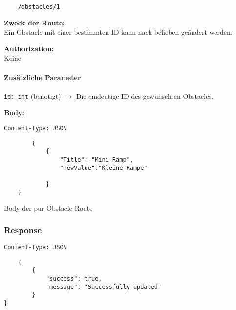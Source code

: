 \begin{lstlisting}
    /obstacles/1
\end{lstlisting}

\textbf{Zweck der Route:} \\
Ein Obstacle mit einer bestimmten ID kann nach belieben geändert werden.

\textbf{Authorization:} \\
Keine

\paragraph{Zusätzliche Parameter}
\lstinline{id: int} (benötigt)
$\rightarrow$ Die eindeutige ID des gewünschten Obstacles.

\textbf{Body:}\\
\begin{code}
    \lstinline{Content-Type: JSON}
    \begin{lstlisting}
        {
            {
                "Title": "Mini Ramp",
                "newValue":"Kleine Rampe"
    
            }
    }
    \end{lstlisting}
    \caption{Body der pur Obstacle-Route}
\end{code}

\subsubsection{Response}
\lstinline{Content-Type: JSON}
\begin{lstlisting}
    {
        {
            "success": true,
            "message": "Successfully updated"
        }
}
\end{lstlisting}

\pagebreak

